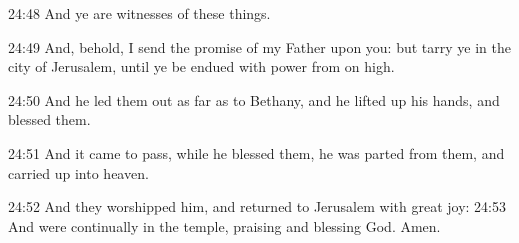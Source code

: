 24:48 And ye are witnesses of these things.

24:49 And, behold, I send the promise of my Father upon you: but tarry
ye in the city of Jerusalem, until ye be endued with power from on
high.

24:50 And he led them out as far as to Bethany, and he lifted up his
hands, and blessed them.

24:51 And it came to pass, while he blessed them, he was parted from
them, and carried up into heaven.

24:52 And they worshipped him, and returned to Jerusalem with great
joy: 24:53 And were continually in the temple, praising and blessing
God. Amen.

